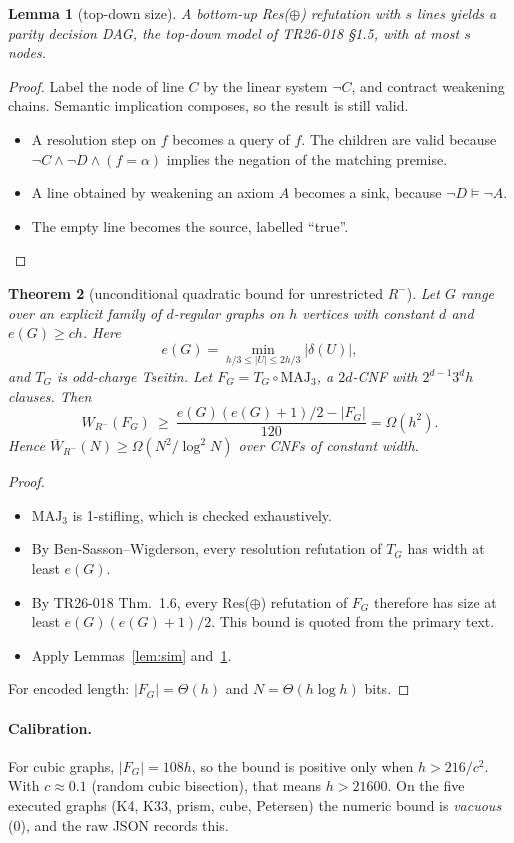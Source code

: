 \documentclass[11pt]{article}
\newtheorem{theorem}{Theorem}
\newtheorem{lemma}[theorem]{Lemma}
\begin{document}
\begin{lemma}[top-down size]\label{lem:td}
A bottom-up Res($\oplus$) refutation with $s$ lines yields a parity decision DAG, the top-down model of TR26-018 \S1.5, with at most $s$ nodes.
\end{lemma}
\begin{proof}
Label the node of line $C$ by the linear system $\neg C$, and contract weakening chains. Semantic implication composes, so the result is still valid.
\begin{itemize}
\item A resolution step on $f$ becomes a query of $f$. The children are valid because $\neg C\wedge\neg D\wedge(f=\alpha)$ implies the negation of the matching premise.
\item A line obtained by weakening an axiom $A$ becomes a sink, because $\neg D\models\neg A$.
\item The empty line becomes the source, labelled ``true''.
\end{itemize}
\end{proof}

\begin{theorem}[unconditional quadratic bound for unrestricted $R^-$]\label{thm:quad}
Let $G$ range over an explicit family of $d$-regular graphs on $h$ vertices with constant $d$ and $e(G)\ge ch$. Here
\[e(G)=\min_{h/3\le|U|\le2h/3}|\delta(U)|,\]
and $T_G$ is odd-charge Tseitin. Let $F_G=T_G\circ\mathrm{MAJ}_3$, a $2d$-CNF with $2^{d-1}3^d h$ clauses. Then
\[W_{R^-}(F_G)\ \ge\ \frac{e(G)(e(G)+1)/2-|F_G|}{120}=\Omega(h^2).\]
Hence $\overline W_{R^-}(N)\ge\Omega(N^2/\log^2N)$ over CNFs of constant width.
\end{theorem}
\begin{proof}
\begin{itemize}
\item $\mathrm{MAJ}_3$ is 1-stifling, which is checked exhaustively.
\item By Ben-Sasson--Wigderson, every resolution refutation of $T_G$ has width at least $e(G)$.
\item By TR26-018 Thm.~1.6, every Res($\oplus$) refutation of $F_G$ therefore has size at least $e(G)(e(G){+}1)/2$. This bound is quoted from the primary text.
\item Apply Lemmas~\ref{lem:sim} and~\ref{lem:td}.
\end{itemize}
For encoded length: $|F_G|=\Theta(h)$ and $N=\Theta(h\log h)$ bits.
\end{proof}

\paragraph{Calibration.} For cubic graphs, $|F_G|=108h$, so the bound is positive only when $h>216/c^2$. With $c\approx0.1$ (random cubic bisection), that means $h>21600$. On the five executed graphs (K4, K33, prism, cube, Petersen) the numeric bound is \emph{vacuous} (0), and the raw JSON records this.
\end{document}
